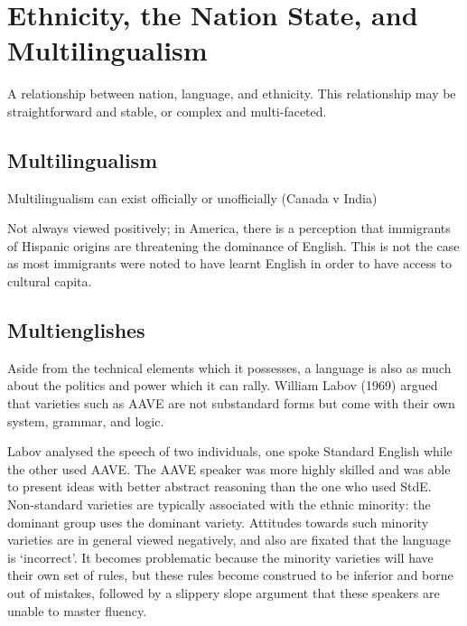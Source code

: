 \documentclass[../main.tex]{subfiles}
\begin{document}
    \section{Ethnicity, the Nation State, and Multilingualism}
    A relationship between nation, language, and ethnicity. This relationship may be straightforward and stable, or complex and multi-faceted.
    
    \subsection{Multilingualism}
    Multilingualism can exist officially or unofficially (Canada v India) \par
    Not always viewed positively; in America, there is a perception that immigrants of Hispanic origins are threatening the dominance of English. This is not the case as most immigrants were noted to have learnt English in order to have access to cultural capita. \par
    
    \subsection{Multienglishes}
    Aside from the technical elements which it possesses, a language is also as much about the politics and power which it can rally. William Labov (1969) argued that varieties such as AAVE are not substandard forms but come with their own system, grammar, and logic. \par
    Labov analysed the speech of two individuals, one spoke Standard English while the other used AAVE. The AAVE speaker was more highly skilled and was able to present ideas with better abstract reasoning than the one who used StdE. Non-standard varieties are typically associated with the ethnic minority: the dominant group uses the dominant variety. Attitudes towards such minority varieties are in general viewed negatively, and also are fixated that the language is `incorrect'. It becomes problematic because the minority varieties will have their own set of rules, but these rules become construed to be inferior and borne out of mistakes, followed by a slippery slope argument that these speakers are unable to master fluency.
\end{document}
